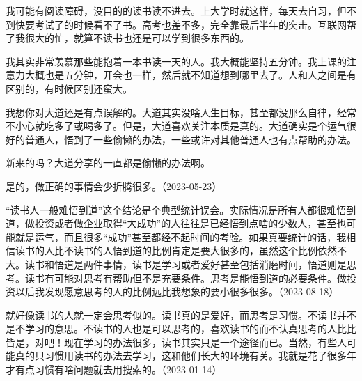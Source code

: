 我可能有阅读障碍，没目的的读书读不进去。上大学时就这样，每天去自习，但不到快要考试了的时候看不了书。高考也差不多，完全靠最后半年的突击。互联网帮了我很大的忙，就算不读书也还是可以学到很多东西的。


我其实非常羡慕那些能抱着一本书读一天的人。我大概能坚持五分钟。我上课的注意力大概也是五分钟，开会也一样，然后就不知道想到哪里去了。人和人之间是有区别的，有时候区别还蛮大。


我想你对大道还是有点误解的。大道其实没啥人生目标，甚至都没那么自律，经常不小心就吃多了或喝多了。但是，大道喜欢关注本质是真的。大道确实是个运气很好的普通人，悟到了一些偷懒的办法，一些或许对其他普通人也有点帮助的办法。


新来的吗？大道分享的一直都是偷懒的办法啊。


是的，做正确的事情会少折腾很多。（2023-05-23）


“读书人一般难悟到道”这个结论是个典型统计误会。实际情况是所有人都很难悟到道，做投资或者做企业取得“大成功”的人往往是已经悟到点啥的少数人，甚至也可能就是运气，而且很多“成功”甚至都经不起时间的考验。如果真要统计的话，我相信读书的人比不读书的人悟到道的比例肯定是要大很多的，虽然这个比例依然不大。读书和悟道是两件事情，读书是学习或者爱好甚至包括消磨时间，悟道则是思考。读书有可能对思考有帮助但不是充要条件。思考是能悟到道的必要条件。做投资以后我发现愿意思考的人的比例远比我想象的要小很多很多。（2023-08-18）


就好像读书的人就一定会思考似的。读书真的是爱好，而思考是习惯。不读书并不是不学习的意思。不读书的人也是可以思考的，喜欢读书的而不认真思考的人比比皆是，对吧！现在学习的办法很多，读书其实只是一个途径而已。当然，有些人可能真的只习惯用读书的办法去学习，这和他们长大的环境有关。我就是花了很多年才有点习惯有啥问题就去用搜索的。（2023-01-14）
